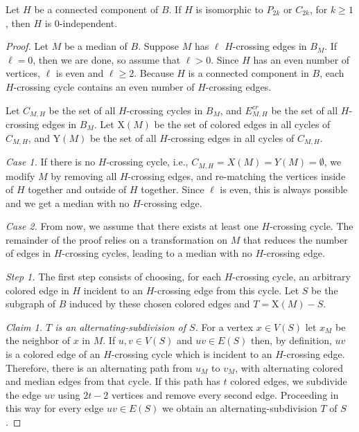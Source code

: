 \documentclass[10pt]{llncs}
\begin{document}
\begin{proposition}\label{indep}
  Let $H$ be a connected component of $B$. If $H$ is isomorphic to
  $P_{2k}$ or $C_{2k}$, for $k\geq 1$, then $H$ is 0-independent.
\end{proposition}

\begin{proof}
  Let $M$ be a median of $B$. Suppose $M$ has $\ell$ $H$-crossing
  edges in $B_M$. If $\ell = 0$, then we are done, so assume that
  $\ell > 0$. Since $H$ has an even number of vertices, $\ell$ is even
  and $\ell \geq 2$. Because $H$ is a connected component in $B$, each
  $H$-crossing cycle contains an even number of $H$-crossing edges.
  
  Let $C_{M,H}$ be the set of all $H$-crossing cycles in $B_M$, and
  $E^{cr}_{M,H}$ be the set of all $H$-crossing edges in $B_M$.  Let
  $\text{X}(M)$ be the set of colored edges in all cycles of
  $C_{M,H}$, and $\text{Y}(M)$ be the set of all $H$-crossing edges in
  all cycles of $C_{M,H}$.

  {\smallskip\noindent\em Case 1.} If there is no $H$-crossing cycle,
  i.e., $C_{M,H} = X(M)=Y(M) = \emptyset$, we modify $M$ by
  removing all $H$-crossing edges, and re-matching the vertices inside
  of $H$ together and outside of $H$ together. Since $\ell$ is even,
  this is always possible and we get a median with no $H$-crossing
  edge.  

  {\smallskip\noindent\em Case 2.} From now, we assume that there
  exists at least one $H$-crossing cycle. The remainder of the proof
  relies on a transformation on $M$ that reduces the number of edges
  in $H$-crossing cycles, leading to a median with no $H$-crossing
  edge.

  {\smallskip\noindent\em Step 1.} The first step consists of
  choosing, for each $H$-crossing cycle, an arbitrary colored edge in
  $H$ incident to an $H$-crossing edge from this cycle. Let $S$ be the
  subgraph of $B$ induced by these chosen colored edges and
  $T=\text{X}(M) - S$.



  {\smallskip\noindent\em Claim 1. $T$ is an alternating-subdivision
    of $S$.} For a vertex $x \in V(S)$ let $x_M$ be the neighbor of
  $x$ in $M$. If $u, v \in V(S)$ and $uv \in E(S)$ then, by
  definition, $uv$ is a colored edge of an $H$-crossing cycle which is
  incident to an $H$-crossing edge. Therefore, there is an alternating
  path from $u_M$ to $v_M$, with alternating colored and median edges
  from that cycle. If this path has $t$ colored edges, we subdivide
  the edge $uv$ using $2t-2$ vertices and remove every second
  edge. Proceeding in this way for every edge $uv \in E(S)$ we obtain
  an alternating-subdivision $T$ of $S$.


\end{proof}
\end{document}
